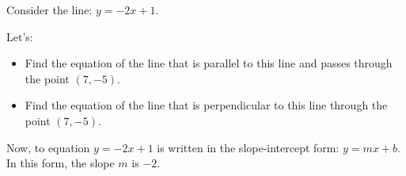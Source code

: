 \label{les_2_unit_1:write_parallel_and_perpendicular_line}

Consider the line: $y = -2x + 1$.

Let's:

\begin{itemize}
  \label{item:instructions}

  \item Find the equation of the line that is parallel to this line and passes
    through the point $(7, -5)$. 
  \item Find the equation of the line that is perpendicular to this line
    through the point $(7, -5)$.
\end{itemize}

Now, to equation $y = -2x + 1$ is written in the slope-intercept form:
$y = mx + b$. In this form, the slope $m$ is $-2$.


